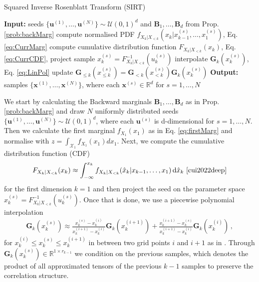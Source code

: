 \begin{algorithm}[!th]
	\caption{Squared Inverse Rosenblatt Transform (SIRT)}
	\begin{algorithmic}[1]
		\STATE \textbf{Input:} seeds $\{ \bm{u}^{(1)},\dots, \bm{u}^{(N)} \} \sim \mathcal{U}(0,1)^d $ and $\bm{B}_1 , \dots,\bm{B}_d$  from Prop. \ref{prob:backMarg}
		\STATE compute normalised PDF $ f_{X_k|X_{<k}}(x_k|x^{(s)}_{k-1},\dots,x^{(s)}_1)$, Eq. \ref{eq:CurrMarg}
		\STATE compute cumulative distribution function $F_{X_k|X_{<k}}(x_k)$, Eq. \ref{eq:CurrCDF},
		\STATE project sample $x^{(s)}_k = F_{X_k|X_{<k}}^{-1}(u^{(s)}_k)$
		\STATE interpolate $\bm{G}_k(x^{(s)}_k)$, Eq. \ref{eq:LinPol}
		\STATE update $\bm{G}_{\leq k}(x^{(s)}_{\leq k}) = \bm{G}_{<k}(x^{(s)}_{<k}) \bm{G}_k(x^{(s)}_k)$
		\ENDFOR
		\ENDFOR
		\STATE \textbf{Output:} samples $\{ \bm{x}^{(1)},\dots, \bm{x}^{(N)} \} $, where each $\bm{x}^{(s)} \in \mathbb{R}^d$ for $s = 1, \dots, N$
	\end{algorithmic}
	\label{alg:SIRT}
\end{algorithm}
We start by calculating the Backward marginals $\bm{B}_1 , \dots,\bm{B}_d$ as in Prop. \ref{prob:backMarg} and draw $N$ uniformly distributed seeds $\{ \bm{u}^{(1)},\dots, \bm{u}^{(N)} \} \sim \mathcal{U}(0,1)^d $, where each $\bm{u}^{(s)}$ is d-dimensional for $s = 1, \dots, N$.
Then we calculate the first marginal $f_{X_1}(x_1)$ as in Eq. \ref{eq:firstMarg} and normalise with $z = \int_{\mathcal{X}_1} f_{X_1}(x_1) d x_1$.
Next, we compute the cumulative distribution function (CDF)
\begin{align}
	F_{X_k|X_{<k}}(x_k) \approx \int_{-\infty}^{x_k} f_{X_k|X_{<k}}(\hat{x}_k|x_{k-1},\dots,x_1) \diff \hat{x}_k  \, \, \text{\cite[Eq. 17]{cui2022deep}}
	\label{eq:CurrCDF}
\end{align}
for the first dimension $k = 1$ and then project the seed  on the parameter space $x^{(s)}_k = F_{X_k|X_{<k}}^{-1}(u^{(s)}_k)$.
Once that is done, we use a piecewise polynomial interpolation
\begin{align}
	\bm{G}_k(x^{(s)}_k) \approx   \frac{x^{(s)}_k - x^{(i)}_k }{x^{(i+1)}_k -x^{(i)}_k } \bm{G}_k(x^{(i+1)}_k) + \frac{ x^{(i+1)}_k - x^{(s)}_k}{x^{(i+1)}_k -x^{(i)}_k } \bm{G}_k(x^{(i)}_k) \, ,
	\label{eq:LinPol}
\end{align}
for $x^{(i)}_k \leq x^{(s)}_k \leq x^{(i+1)}_k$ in between two grid points $i$ and $i+1$ as in \cite{dolgov2020approximation}.
Through $\bm{G}_k(x^{(s)}_k)\in \mathbb{R}^{1 \times r_{k-1}}$ we condition on the previous samples, which denotes the product of all approximated tensors of the previous $k-1$ samples to preserve the correlation structure.
